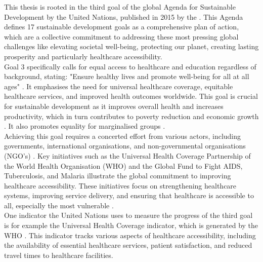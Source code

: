 \documentclass[11pt, a4paper]{report}
\begin{document}
This thesis is rooted in the third goal of the global Agenda for Sustainable Development by the United Nations, published in 2015 by the \citet{united_nations_transforming_2015}. This Agenda defines 17 sustainable development goals as a comprehensive plan of action, which are a collective commitment to addressing these most pressing global challenges like elevating societal well-being, protecting our planet, creating lasting prosperity and particularly healthcare accessibility. \\
%
Goal 3 specifically calls for equal access to healthcare and education regardless of background, stating: "Ensure healthy lives and promote well-being for all at all ages" \citep{united_nations_transforming_2015}. It emphasises the need for universal healthcare coverage, equitable healthcare services, and improved health outcomes worldwide. This goal is crucial for sustainable development as it improves overall health and increases productivity, which in turn contributes to poverty reduction and economic growth \citet{zhao_economic_2016}. It also promotes equality for marginalised groups \citet{davy_access_2016}. \\
%
Achieving this goal requires a concerted effort from various actors, including governments, international organisations, and non-governmental organisations (NGO's) \citet{sanadgol_engagement_2021}. Key initiatives such as the Universal Health Coverage Partnership of the World Health Organisation (WHO) \citet{uhc-partnership_universal_2021} and the Global Fund to Fight AIDS, Tuberculosis, and Malaria \citet{the_global_fund_global_2024} illustrate the global commitment to improving healthcare accessibility. These initiatives focus on strengthening healthcare systems, improving service delivery, and ensuring that healthcare is accessible to all, especially the most vulnerable  \citet{syed_traveling_2013}. \\
%
One indicator the United Nations uses to measure the progress of the third goal is for example the Universal Health Coverage indicator, which is generated by the WHO \citet{world_health_organization_tracking_2023}. This indicator tracks various aspects of healthcare accessibility, including the availability of essential healthcare services, patient satisfaction, and reduced travel times to healthcare facilities. 
\end{document}
